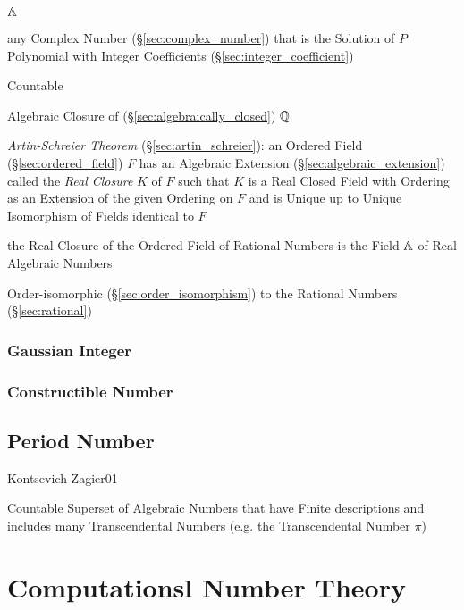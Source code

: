 $\mathbb{A}$

any Complex Number (\S\ref{sec:complex_number}) that is the Solution of $P$
Polynomial with Integer Coefficients (\S\ref{sec:integer_coefficient})

Countable

Algebraic Closure of (\S\ref{sec:algebraically_closed}) $\mathbb{Q}$

\emph{Artin-Schreier Theorem} (\S\ref{sec:artin_schreier}):
an Ordered Field (\S\ref{sec:ordered_field}) $F$ has an Algebraic Extension
(\S\ref{sec:algebraic_extension}) called the \emph{Real Closure} $K$ of $F$
such that $K$ is a Real Closed Field with Ordering as an Extension of the given
Ordering on $F$ and is Unique up to Unique Isomorphism of Fields identical to
$F$

the Real Closure of the Ordered Field of Rational Numbers is the Field
$\mathbb{A}$ of Real Algebraic Numbers

Order-isomorphic (\S\ref{sec:order_isomorphism}) to the Rational
Numbers (\S\ref{sec:rational})



\subsubsection{Gaussian Integer}\label{sec:gaussian_integer}\hfill

\subsubsection{Constructible Number}\label{sec:constructible_number}\hfill



\subsection{Period Number}\label{sec:period_number}

Kontsevich-Zagier01

Countable Superset of Algebraic Numbers that have Finite descriptions
and includes many Transcendental Numbers (e.g. the Transcendental
Number $\pi$)



\section{Computationsl Number Theory}\label{sec:computational_number_theory}


